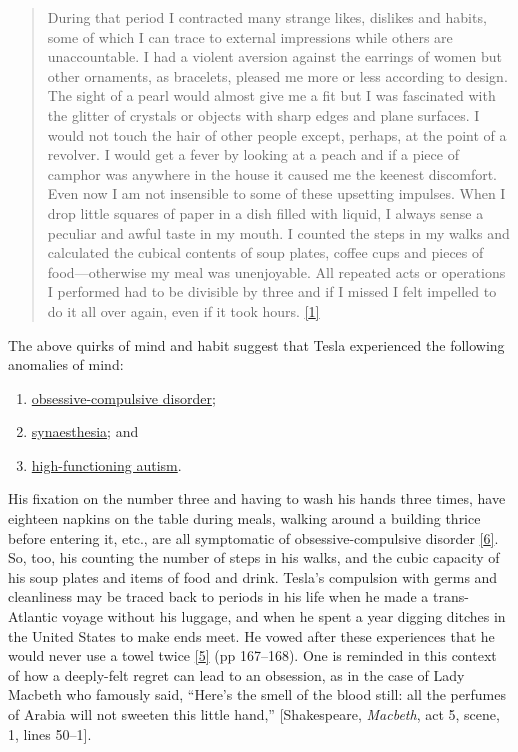 \documentclass[
  a4paper,
]{article}
\providecommand{\tightlist}{%
  \setlength{\itemsep}{0pt}\setlength{\parskip}{0pt}}
\begin{document}
\begin{quote}
During that period I contracted many strange likes, dislikes and habits,
some of which I can trace to external impressions while others are
unaccountable. I had a violent aversion against the earrings of women
but other ornaments, as bracelets, pleased me more or less according to
design. The sight of a pearl would almost give me a fit but I was
fascinated with the glitter of crystals or objects with sharp edges and
plane surfaces. I would not touch the hair of other people except,
perhaps, at the point of a revolver. I would get a fever by looking at a
peach and if a piece of camphor was anywhere in the house it caused me
the keenest discomfort. Even now I am not insensible to some of these
upsetting impulses. When I drop little squares of paper in a dish filled
with liquid, I always sense a peculiar and awful taste in my mouth. I
counted the steps in my walks and calculated the cubical contents of
soup plates, coffee cups and pieces of food---otherwise my meal was
unenjoyable. All repeated acts or operations I performed had to be
divisible by three and if I missed I felt impelled to do it all over
again, even if it took hours. \protect\hyperlink{ref-john83}{{[}1{]}}
\end{quote}

The above quirks of mind and habit suggest that Tesla experienced the
following anomalies of mind:

\begin{enumerate}
\tightlist
\item
  \href{https://en.wikipedia.org/wiki/Obsessive\%E2\%80\%93compulsive_disorder}{obsessive-compulsive
  disorder};
\item
  \href{https://en.wikipedia.org/wiki/Synesthesia}{synaesthesia}; and
\item
  \href{https://en.wikipedia.org/wiki/High-functioning_autism}{high-functioning
  autism}.
\end{enumerate}

His fixation on the number three and having to wash his hands three
times, have eighteen napkins on the table during meals, walking around a
building thrice before entering it, etc., are all symptomatic of
obsessive-compulsive disorder
\protect\hyperlink{ref-tesla-wiki}{{[}6{]}}. So, too, his counting the
number of steps in his walks, and the cubic capacity of his soup plates
and items of food and drink. Tesla's compulsion with germs and
cleanliness may be traced back to periods in his life when he made a
trans-Atlantic voyage without his luggage, and when he spent a year
digging ditches in the United States to make ends meet. He vowed after
these experiences that he would never use a towel twice
\protect\hyperlink{ref-lomas99}{{[}5{]}} (pp 167--168). One is reminded
in this context of how a deeply-felt regret can lead to an obsession, as
in the case of Lady Macbeth who famously said, ``Here's the smell of the
blood still: all the perfumes of Arabia will not sweeten this little
hand,'' {[}Shakespeare, \emph{Macbeth}, act 5, scene, 1, lines 50--1{]}.
\end{document}
